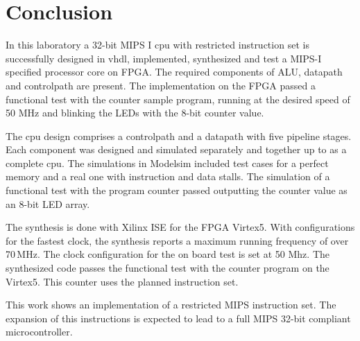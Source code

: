 \chapter{Conclusion}
In this laboratory a 32-bit MIPS I cpu with restricted instruction set is successfully designed in vhdl, implemented, synthesized and test a MIPS-I specified processor core on FPGA. 
The required components of ALU, datapath and controlpath are present.
The implementation on the FPGA passed a functional test with the counter sample program, running at the desired speed of 50 MHz and blinking the LEDs with the 8-bit counter value.

The cpu design comprises a controlpath and a datapath with five pipeline stages.  Each component was designed and simulated separately and
together up to as a complete cpu. The simulations in Modelsim included test cases for a perfect memory and a real one with instruction and data stalls.
The simulation of a functional test with the program counter passed outputting the counter value as an 8-bit LED array.

The synthesis is done with Xilinx ISE for the FPGA Virtex5. With configurations for the fastest clock, the synthesis reports a maximum running
frequency of over 70\,MHz. The clock configuration for the on board test is set at 50 Mhz. The synthesized code passes the functional test with
the counter program on the Virtex5. This counter uses the planned instruction set.

This work shows an implementation of a restricted MIPS instruction set. The expansion of this instructions is expected to lead to a full MIPS 32-bit compliant microcontroller.